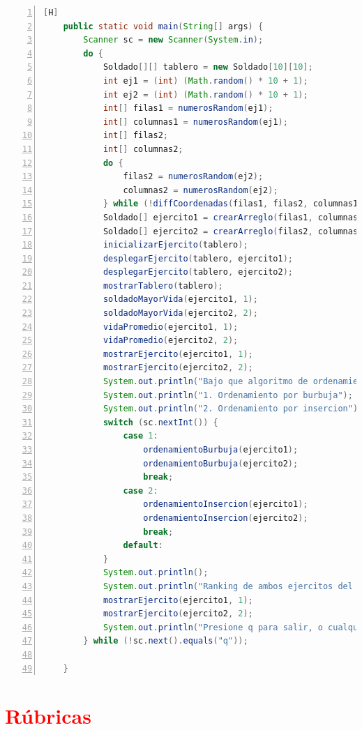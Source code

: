 \documentclass{article}
\begin{document}
	\begin{lstlisting}[language=java,caption={Método main final}, numbers=left][H]
	public static void main(String[] args) {
        Scanner sc = new Scanner(System.in);
        do {
            Soldado[][] tablero = new Soldado[10][10];
            int ej1 = (int) (Math.random() * 10 + 1);
            int ej2 = (int) (Math.random() * 10 + 1);
            int[] filas1 = numerosRandom(ej1);
            int[] columnas1 = numerosRandom(ej1);
            int[] filas2;
            int[] columnas2;
            do {
                filas2 = numerosRandom(ej2);
                columnas2 = numerosRandom(ej2);
            } while (!diffCoordenadas(filas1, filas2, columnas1, columnas2));
            Soldado[] ejercito1 = crearArreglo(filas1, columnas1, 1);
            Soldado[] ejercito2 = crearArreglo(filas2, columnas2, 2);
            inicializarEjercito(tablero);
            desplegarEjercito(tablero, ejercito1);
            desplegarEjercito(tablero, ejercito2);
            mostrarTablero(tablero);
            soldadoMayorVida(ejercito1, 1);
            soldadoMayorVida(ejercito2, 2);
            vidaPromedio(ejercito1, 1);
            vidaPromedio(ejercito2, 2);
            mostrarEjercito(ejercito1, 1);
            mostrarEjercito(ejercito2, 2);
            System.out.println("Bajo que algoritmo de ordenamiento le gustaria ordenar su ejercito?");
            System.out.println("1. Ordenamiento por burbuja");
            System.out.println("2. Ordenamiento por insercion");
            switch (sc.nextInt()) {
                case 1:
                    ordenamientoBurbuja(ejercito1);
                    ordenamientoBurbuja(ejercito2);
                    break;
                case 2:
                    ordenamientoInsercion(ejercito1);
                    ordenamientoInsercion(ejercito2);
                    break;
                default:
            }
            System.out.println();
            System.out.println("Ranking de ambos ejercitos del soldado con mayor a menor vida: \n");
            mostrarEjercito(ejercito1, 1);
            mostrarEjercito(ejercito2, 2);
            System.out.println("Presione q para salir, o cualquier otra tecla para volver a jugar");
        } while (!sc.next().equals("q"));

    }
	\end{lstlisting}
	\section{\textcolor{red}{Rúbricas}}
	
\end{document}
